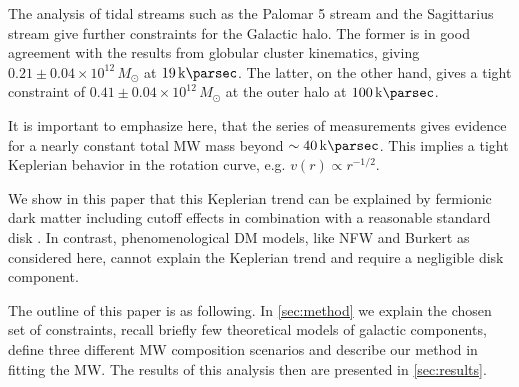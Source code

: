 The analysis of tidal streams such as the Palomar 5 stream \citep{2015ApJ...803...80K} and the Sagittarius stream \citep{2014MNRAS.445.3788G} give further constraints for the Galactic halo. The former is in good agreement with the results from globular cluster kinematics, giving $0.21 \pm 0.04 \times 10^{12}\,M_\odot$ at $\SI{19}{\kilo\parsec}$. The latter, on the other hand, gives a tight constraint of $0.41 \pm 0.04 \times 10^{12}\,M_\odot$ at the outer halo at $\SI{100}{\kilo\parsec}$.

It is important to emphasize here, that the series of measurements gives evidence for a nearly constant total MW mass beyond $\sim\SI{40}{\kilo\parsec}$. This implies a tight Keplerian behavior in the rotation curve, e.g. $v(r) \propto r^{-1/2}$.

We show in this paper that this Keplerian trend can be explained by fermionic dark matter including cutoff effects \citep{2016arXiv160607040A} in combination with a reasonable standard disk \citep{2013PASJ...65..118S}. In contrast, phenomenological DM models, like NFW and Burkert as considered here, cannot explain the Keplerian trend and require a negligible disk component.

The outline of this paper is as following. In \cref{sec:method} we explain the chosen set of constraints, recall briefly few theoretical models of galactic components, define three different MW composition scenarios and describe our method in fitting the MW. The results of this analysis then are presented in \cref{sec:results}.